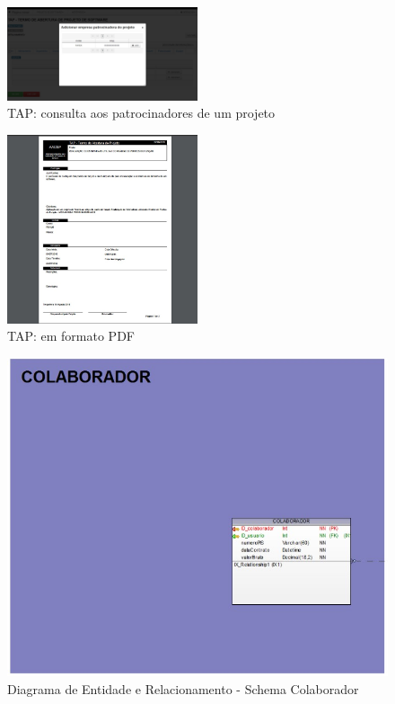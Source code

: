 \documentclass{acm_proc_article-sp}
\begin{document}
\begin{appendices}
\begin{figure}[h]
\centering %
\includegraphics[width=0.5\textwidth]{RF_TAPDetalhamento_addPatrocinador.jpg} %
\caption{TAP: consulta aos patrocinadores de um projeto}
\end{figure}

\begin{figure}[h]
\centering %
\includegraphics[width=0.5\textwidth]{RF_Termo_de_Abertura_de_projeto_em_PDF.jpg} %
\caption{TAP: em formato PDF}
\end{figure}

\begin{figure}[h]
\centering %
\includegraphics[width=1\textwidth]{DER_colaborador.jpg} %
\caption{Diagrama de Entidade e Relacionamento - Schema Colaborador}
\end{figure}


\end{appendices}
\end{document}
